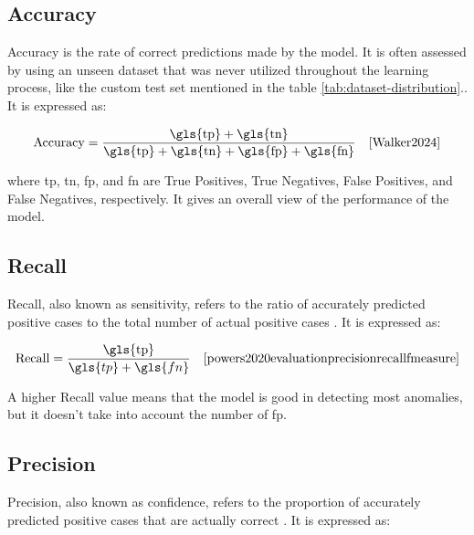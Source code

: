 \subsection*{Accuracy}
\label{subsec:Accuracy}

Accuracy is the rate of correct predictions made by the model. It is often assessed by using an unseen dataset that was never utilized throughout the learning process, like the custom test set mentioned in the table \ref{tab:dataset-distribution}.\cite{Kohavi1998}. It is expressed as: 

\begin{equation}
    \text{Accuracy} = \frac{\text{\gls{tp}} + \text{\gls{tn}}}{\text{\gls{tp}} + \text{\gls{tn}} + \text{\gls{fp}} + \text{\gls{fn}}} \quad \text{\cite{Walker2024}}
    \label{eq:accuracy}
\end{equation}

where \gls{tp}, \gls{tn}, \gls{fp}, and \gls{fn} are True Positives, True Negatives, False Positives, and False Negatives, respectively. It gives an overall view of the performance of the model.

\subsection*{Recall}
\label{subsec:Recall}

Recall, also known as sensitivity, refers to the ratio of accurately predicted positive cases to the total number of actual positive cases \cite{powers2020evaluationprecisionrecallfmeasure}. It is expressed as:

\begin{equation}
    \text{Recall} = \frac{\text{\gls{tp}}}{\gls{tp} + \gls{fn}} \quad \text{\cite{powers2020evaluationprecisionrecallfmeasure}}
    \label{eq:recall}
\end{equation}

A higher Recall value means that the model is good in detecting most anomalies, but it doesn't take into account the number of \gls{fp}.

\subsection*{Precision}
\label{subsec:Precision}

Precision, also known as confidence, refers to the proportion of accurately predicted positive cases that are actually correct \cite{powers2020evaluationprecisionrecallfmeasure}. It is expressed as:

